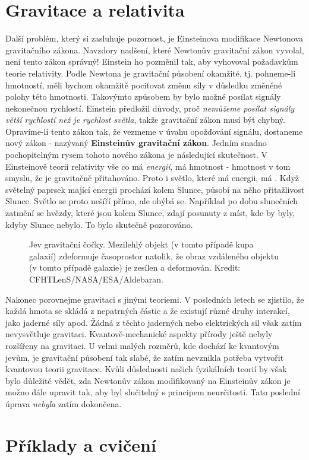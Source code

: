   \section{Gravitace a relativita}
    Další problém, který si zasluhuje pozornost, je Einsteinova modifikace Newtonova gravitačního 
    zákona. Navzdory nadšení, které Newtonův gravitační zákon vyvolal, není tento zákon správný! 
    Einstein ho pozměnil tak, aby vyhovoval požadavkům teorie relativity. Podle Newtona je 
    gravitační působení okamžité, tj. pohneme-li hmotností, měli bychom okamžitě pociťovat změnu 
    síly v důsledku změněné polohy této hmotnosti. Takovýmto způsobem by bylo možné posílat signály 
    nekonečnou rychlostí. Einstein předložil důvody, proč \emph{nemůžeme posílat signály větší 
    rychlostí než je rychlost světla}, takže gravitační zákon musí být chybný. Opravíme-li tento 
    zákon tak, že vezmeme v úvahu opožďování signálu, dostaneme nový zákon - nazývaný 
    \textbf{Einsteinův gravitační zákon}. Jedním snadno pochopitelným rysem tohoto nového zákona je 
    následující skutečnost. V Einsteinově teorii relativity vše co má \emph{energii}, má hmotnost - 
    hmotnost v tom smyslu, že je gravitačně přitahováno. Proto i světlo, které má energii, má 
    . Když světelný paprsek mající energii prochází kolem Slunce, působí na něho 
    přitažlivost Slunce. Světlo se proto nešíří přímo, ale ohýbá se. Například po dobu slunečních 
    zatmění se hvězdy, které jsou kolem Slunce, zdají posunuty z míst, kde by byly, kdyby Slunce 
    nebylo. To bylo skutečně pozorováno.

    \begin{figure}[ht!]  %
      \centering
      \caption{ Jev gravitační čočky. Mezilehlý objekt (v tomto případě kupa galaxií) zdeformuje
                časoprostor natolik, že obraz vzdáleného objektu (v tomto případě galaxie) je
                zesílen a deformován. Kredit: CFHTLenS/NASA/ESA/Aldebaran.}
      \label{fyz:fig0888}
    \end{figure}
    
    Nakonec porovnejme gravitaci s jinými teoriemi. V posledních letech se zjistilo, že každá hmota 
    se skládá z nepatrných částic a že existují různé druhy interakcí, jako jaderné síly apod. 
    Žádná z těchto jaderných nebo elektrických sil však zatím nevysvětluje gravitaci.     
    Kvantově-mechanické aspekty přírody ještě nebyly rozšířeny na gravitaci. U velmi malých 
    rozměrů, kde dochází ke kvantovým jevům, je gravitační působení tak slabé, že zatím nevznikla 
    potřeba vytvořit kvantovou teorii gravitace. Kvůli důslednosti našich fyzikálních teorií by 
    však bylo důležité vědět, zda Newtonův zákon modifikovaný na Einsteinův zákon je možno dále 
    upravit tak, aby byl slučitelný s principem neurčitosti. Tato poslední úprava \emph{nebyla} 
    zatím dokončena.
  
  \section{Příklady a cvičení}

